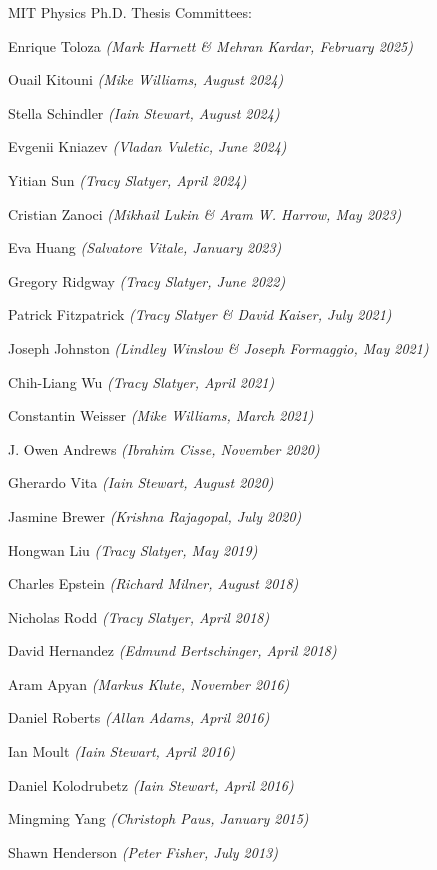 \bbl

\item MIT Physics Ph.D. Thesis Committees:
\bsbl 
\item Enrique Toloza \textit{(Mark Harnett \& Mehran Kardar, February 2025)}
\item Ouail Kitouni \textit{(Mike Williams, August 2024)}
\item Stella Schindler \textit{(Iain Stewart, August 2024)}
\item Evgenii Kniazev \textit{(Vladan Vuletic, June 2024)}
\item Yitian Sun \textit{(Tracy Slatyer, April 2024)}
\item Cristian Zanoci \textit{(Mikhail Lukin \& Aram W. Harrow, May 2023)}
\item Eva Huang \textit{(Salvatore Vitale, January 2023)}
\item Gregory Ridgway \textit{(Tracy Slatyer, June 2022)}
\item Patrick Fitzpatrick \textit{(Tracy Slatyer \& David Kaiser, July 2021)}
\item Joseph Johnston \textit{(Lindley Winslow \& Joseph Formaggio, May 2021)}
\item Chih-Liang Wu \textit{(Tracy Slatyer, April 2021)}
\item Constantin Weisser \textit{(Mike Williams, March 2021)}
\item J. Owen Andrews \textit{(Ibrahim Cisse, November 2020)}
\item Gherardo Vita \textit{(Iain Stewart, August 2020)}
\item Jasmine Brewer \textit{(Krishna Rajagopal, July 2020)}
\item Hongwan Liu \textit{(Tracy Slatyer, May 2019)}
\item Charles Epstein \textit{(Richard Milner, August 2018)}
\item Nicholas Rodd \textit{(Tracy Slatyer, April 2018)}
\item David Hernandez \textit{(Edmund Bertschinger, April 2018)}
\item Aram Apyan \textit{(Markus Klute, November 2016)}
\item Daniel Roberts \textit{(Allan Adams, April 2016)}
\item Ian Moult \textit{(Iain Stewart, April 2016)}
\item Daniel Kolodrubetz \textit{(Iain Stewart, April 2016)}
\item Mingming Yang \textit{(Christoph Paus, January 2015)}
\item Shawn Henderson \textit{(Peter Fisher, July 2013)}
